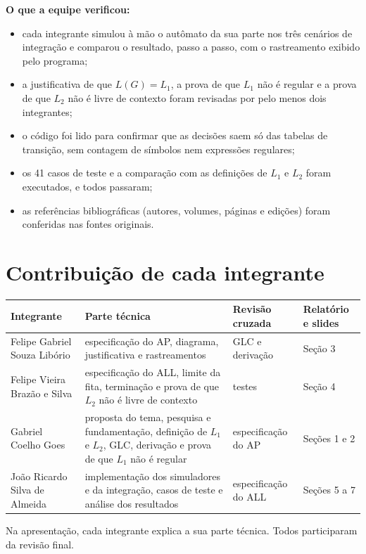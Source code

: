 \documentclass[11pt,a4paper]{article}
\newcommand{\Lum}{L_1}
\newcommand{\Ldois}{L_2}
\begin{document}
\textbf{O que a equipe verificou:}
\begin{itemize}
  \item cada integrante simulou à mão o autômato da sua parte nos três cenários de integração e comparou o resultado, passo a passo, com o rastreamento exibido pelo programa;
  \item a justificativa de que $L(G)=\Lum$, a prova de que $\Lum$ não é regular e a prova de que $\Ldois$ não é livre de contexto foram revisadas por pelo menos dois integrantes;
  \item o código foi lido para confirmar que as decisões saem só das tabelas de transição, sem contagem de símbolos nem expressões regulares;
  \item os 41 casos de teste e a comparação com as definições de $\Lum$ e $\Ldois$ foram executados, e todos passaram;
  \item as referências bibliográficas (autores, volumes, páginas e edições) foram conferidas nas fontes originais.
\end{itemize}

\section{Contribuição de cada integrante}

\begin{center}
\begin{tabular}{p{3.6cm}p{4.4cm}p{2.6cm}p{3.4cm}}
\toprule
Integrante & Parte técnica & Revisão cruzada & Relatório e slides \\
\midrule
Felipe Gabriel Souza Libório & especificação do AP, diagrama, justificativa e rastreamentos & GLC e derivação & Seção 3 \\
\addlinespace
Felipe Vieira Brazão e Silva & especificação do ALL, limite da fita, terminação e prova de que $\Ldois$ não é livre de contexto & testes & Seção 4 \\
\addlinespace
Gabriel Coelho Goes & proposta do tema, pesquisa e fundamentação, definição de $\Lum$ e $\Ldois$, GLC, derivação e prova de que $\Lum$ não é regular & especificação do AP & Seções 1 e 2 \\
\addlinespace
João Ricardo Silva de Almeida & implementação dos simuladores e da integração, casos de teste e análise dos resultados & especificação do ALL & Seções 5 a 7 \\
\bottomrule
\end{tabular}

\medskip
Na apresentação, cada integrante explica a sua parte técnica. Todos participaram da revisão final.
\end{center}
\end{document}
